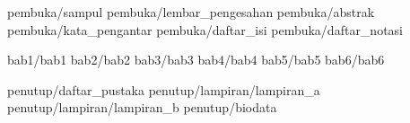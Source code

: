 \documentclass[a5paper, twoside, 11pt, listof=nochaptergap] {book}
\begin{document}
	
	\pagestyle {normal}
	
	\frontmatter
		 {pembuka/sampul}
		 {pembuka/lembar_pengesahan}
		 {pembuka/abstrak}
		 {pembuka/kata_pengantar}
		 {pembuka/daftar_isi}
		 {pembuka/daftar_notasi}
	
	\mainmatter
		 {bab1/bab1} \cleardoublepage
		 {bab2/bab2} \cleardoublepage
		 {bab3/bab3} \cleardoublepage
		 {bab4/bab4} \cleardoublepage
		 {bab5/bab5} \cleardoublepage
		 {bab6/bab6} \cleardoublepage
	
	\backmatter
		 {penutup/daftar_pustaka}
		 {penutup/lampiran/lampiran_a}
		 {penutup/lampiran/lampiran_b}
		 {penutup/biodata}
\end{document}
